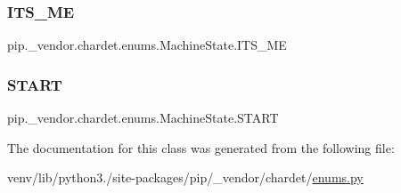 \subsubsection{\texorpdfstring{I\+T\+S\+\_\+\+ME}{ITS\_ME}}
{\footnotesize\ttfamily pip.\+\_\+vendor.\+chardet.\+enums.\+Machine\+State.\+I\+T\+S\+\_\+\+ME\hspace{0.3cm}{\ttfamily [static]}}

\mbox{\label{classpip_1_1__vendor_1_1chardet_1_1enums_1_1MachineState_abb5b63be135893f116fb4d9352868e65}} 
\subsubsection{\texorpdfstring{S\+T\+A\+RT}{START}}
{\footnotesize\ttfamily pip.\+\_\+vendor.\+chardet.\+enums.\+Machine\+State.\+S\+T\+A\+RT\hspace{0.3cm}{\ttfamily [static]}}



The documentation for this class was generated from the following file\+:\begin{DoxyCompactItemize}
\item 
venv/lib/python3./site-\/packages/pip/\+\_\+vendor/chardet/\hyperlink{enums_8py}{enums.\+py}\end{DoxyCompactItemize}
